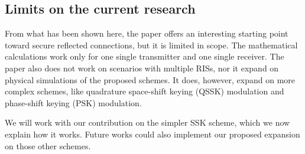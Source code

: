 \subsection{Limits on the current research}

From what has been shown here, the paper \cite{9328149} offers an interesting starting point toward secure reflected connections, but it is limited in scope. The mathematical calculations work only for one single transmitter and one single receiver. The paper also does not work on scenarios with multiple RISs, nor it expand on physical simulations of the proposed schemes. It does, however, expand on more complex schemes, like quadrature space-shift keying (QSSK) modulation and phase-shift keying (PSK) modulation.

We will work with our contribution on the simpler SSK scheme, which we now explain how it works. Future works could also implement our proposed expansion on those other schemes.
